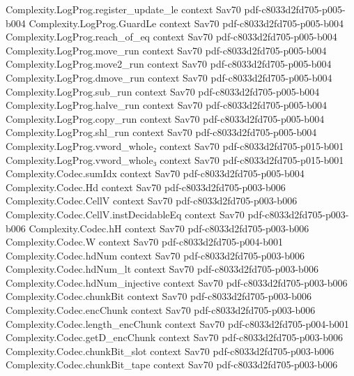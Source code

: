 \begin{theorem}
\proofstep
  {Complexity.LogProg.register_update_le}
  {context}
  {Sav70}
  {pdf-c8033d2fd705-p005-b004}
\proofstep
  {Complexity.LogProg.GuardLe}
  {context}
  {Sav70}
  {pdf-c8033d2fd705-p005-b004}
\proofstep
  {Complexity.LogProg.reach_of_eq}
  {context}
  {Sav70}
  {pdf-c8033d2fd705-p005-b004}
\proofstep
  {Complexity.LogProg.move_run}
  {context}
  {Sav70}
  {pdf-c8033d2fd705-p005-b004}
\proofstep
  {Complexity.LogProg.move2_run}
  {context}
  {Sav70}
  {pdf-c8033d2fd705-p005-b004}
\proofstep
  {Complexity.LogProg.dmove_run}
  {context}
  {Sav70}
  {pdf-c8033d2fd705-p005-b004}
\proofstep
  {Complexity.LogProg.sub_run}
  {context}
  {Sav70}
  {pdf-c8033d2fd705-p005-b004}
\proofstep
  {Complexity.LogProg.halve_run}
  {context}
  {Sav70}
  {pdf-c8033d2fd705-p005-b004}
\proofstep
  {Complexity.LogProg.copy_run}
  {context}
  {Sav70}
  {pdf-c8033d2fd705-p005-b004}
\proofstep
  {Complexity.LogProg.shl_run}
  {context}
  {Sav70}
  {pdf-c8033d2fd705-p005-b004}
\proofstep
  {Complexity.LogProg.vword_whole₂}
  {context}
  {Sav70}
  {pdf-c8033d2fd705-p015-b001}
\proofstep
  {Complexity.LogProg.vword_whole₃}
  {context}
  {Sav70}
  {pdf-c8033d2fd705-p015-b001}
\proofstep
  {Complexity.Codec.sumIdx}
  {context}
  {Sav70}
  {pdf-c8033d2fd705-p005-b004}
\proofstep
  {Complexity.Codec.Hd}
  {context}
  {Sav70}
  {pdf-c8033d2fd705-p003-b006}
\proofstep
  {Complexity.Codec.CellV}
  {context}
  {Sav70}
  {pdf-c8033d2fd705-p003-b006}
\proofstep
  {Complexity.Codec.CellV.instDecidableEq}
  {context}
  {Sav70}
  {pdf-c8033d2fd705-p003-b006}
\proofstep
  {Complexity.Codec.hH}
  {context}
  {Sav70}
  {pdf-c8033d2fd705-p003-b006}
\proofstep
  {Complexity.Codec.W}
  {context}
  {Sav70}
  {pdf-c8033d2fd705-p004-b001}
\proofstep
  {Complexity.Codec.hdNum}
  {context}
  {Sav70}
  {pdf-c8033d2fd705-p003-b006}
\proofstep
  {Complexity.Codec.hdNum_lt}
  {context}
  {Sav70}
  {pdf-c8033d2fd705-p003-b006}
\proofstep
  {Complexity.Codec.hdNum_injective}
  {context}
  {Sav70}
  {pdf-c8033d2fd705-p003-b006}
\proofstep
  {Complexity.Codec.chunkBit}
  {context}
  {Sav70}
  {pdf-c8033d2fd705-p003-b006}
\proofstep
  {Complexity.Codec.encChunk}
  {context}
  {Sav70}
  {pdf-c8033d2fd705-p003-b006}
\proofstep
  {Complexity.Codec.length_encChunk}
  {context}
  {Sav70}
  {pdf-c8033d2fd705-p004-b001}
\proofstep
  {Complexity.Codec.getD_encChunk}
  {context}
  {Sav70}
  {pdf-c8033d2fd705-p003-b006}
\proofstep
  {Complexity.Codec.chunkBit_slot}
  {context}
  {Sav70}
  {pdf-c8033d2fd705-p003-b006}
\proofstep
  {Complexity.Codec.chunkBit_tape}
  {context}
  {Sav70}
  {pdf-c8033d2fd705-p003-b006}
\proofstep

\end{theorem}
